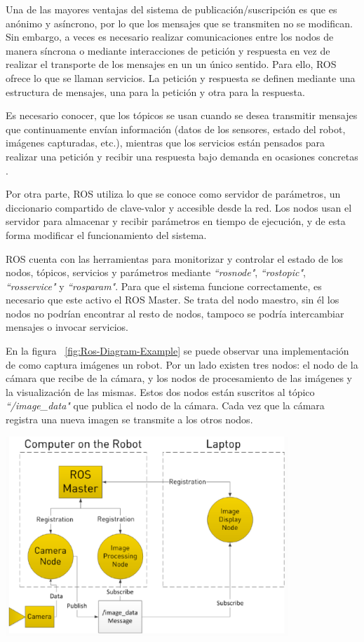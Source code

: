 Una de las mayores ventajas del sistema de publicación/suscripción es que es
anónimo y asíncrono, por lo que los mensajes que se transmiten no se modifican.
Sin embargo, a veces es necesario realizar comunicaciones entre los nodos de
manera síncrona o mediante interacciones de petición y respuesta en vez de
realizar el transporte de los mensajes en un un único sentido. Para ello, ROS
ofrece lo que se llaman servicios. La petición y respuesta se definen mediante
una estructura de mensajes, una para la petición y otra para la respuesta.

Es necesario conocer, que los tópicos se usan cuando se desea transmitir
mensajes que continuamente envían información (datos de los sensores, estado del
robot, imágenes capturadas, etc.), mientras que los servicios están pensados
para realizar una petición y recibir una respuesta bajo demanda en ocasiones
concretas \cite{ROSCommunication}.

Por otra parte, ROS utiliza lo que se conoce como servidor de parámetros, un
diccionario compartido de clave-valor y accesible desde la red. Los nodos usan
el servidor para almacenar y recibir parámetros en tiempo de ejecución, y de
esta forma modificar el funcionamiento del sistema.

ROS cuenta con las herramientas para monitorizar y controlar el estado de los
nodos, tópicos, servicios y parámetros mediante \textit{``rosnode"},
\textit{``rostopic"}, \textit{``rosservice"} y \textit{``rosparam"}. Para que el
sistema funcione correctamente, es necesario que este activo el ROS Master. Se
trata del nodo maestro, sin él los nodos no podrían encontrar al resto de nodos,
tampoco se podría intercambiar mensajes o invocar servicios.

En la figura ~\ref{fig:Ros-Diagram-Example} se puede observar una implementación
de como captura imágenes un robot. Por un lado existen tres nodos: el nodo de la
cámara que recibe de la cámara, y los nodos de procesamiento de las imágenes y
la visualización de las mismas. Estos dos nodos están suscritos al tópico
\textit{``/image\_data"} que publica el nodo de la cámara. Cada vez que la
cámara registra una nueva imagen se transmite a los otros nodos.

\begin{minipage}{\linewidth}
    \centering
    \includegraphics[width=0.8\textwidth]{images/cap3/RosDiagrama.eps}
    \label{fig:Ros-Diagram-Example}
\end{minipage}

